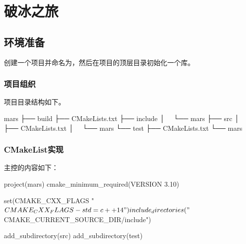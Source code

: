 \section{破冰之旅}

\begin{content}

\subsection{环境准备}

创建一个项目并命名为，然后在项目的顶层目录初始化一个库。

\begin{leftbar}
\end{leftbar}  

\subsubsection{项目组织}

项目目录结构如下。

\begin{leftbar}
 \begin{c++}[caption={\ttfamily{项目组织}}]
mars
├── build
├── CMakeLists.txt
├── include
│   └── mars
├── src
│   ├── CMakeLists.txt
│   └── mars
└── test
    ├── CMakeLists.txt
    └── mars
 \end{c++}
\end{leftbar}

\subsubsection{CMakeList实现}

主控的内容如下：

\begin{leftbar}
 \begin{c++}[caption={\ttfamily{CMakeLists.txt}}]
project(mars)                                                                                  
cmake_minimum_required(VERSION 3.10)

set(CMAKE_CXX_FLAGS "${CMAKE_CXX_FLAGS} -std=c++14")

include_directories("${CMAKE_CURRENT_SOURCE_DIR}/include")

add_subdirectory(src)
add_subdirectory(test)
 \end{c++}
\end{leftbar}


\end{content}
